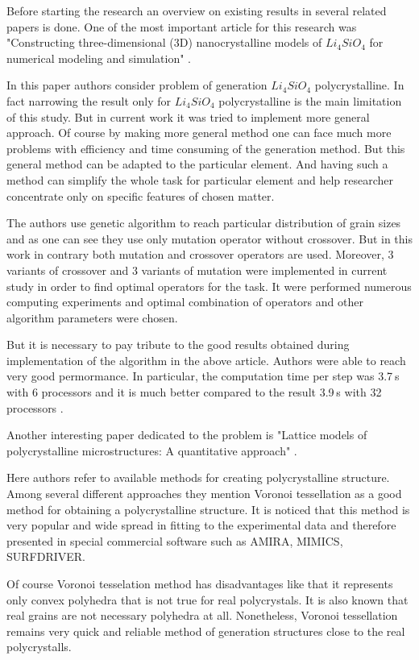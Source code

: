 \documentclass[12pt]{report}
\begin{document}
Before starting the research an overview on existing results in several related papers is done. One of the most important article for this research was "Constructing three-dimensional (3D) nanocrystalline models of $ Li_4SiO_4 $ for numerical modeling and simulation" \cite{shen15}.

In this paper authors consider problem of generation $ Li_4SiO_4 $ polycrystalline. In fact narrowing the result only for $ Li_4SiO_4 $ polycrystalline is the main limitation of this study. But in current work it was tried to implement more general approach. Of course by making more general method one can face much more problems with efficiency and time consuming of the generation method. But this general method can be adapted to the particular element. And having such a method can simplify the whole task for particular element and help researcher concentrate only on specific features of chosen matter.

The authors use genetic algorithm to reach particular distribution of grain sizes and as one can see they use only mutation operator without crossover. But in this work in contrary both mutation and crossover operators are used. Moreover, 3 variants of crossover and 3 variants of mutation were implemented in current study in order to find optimal operators for the task. It were performed numerous computing experiments and optimal combination of operators and other algorithm parameters were chosen.

But it is necessary to pay tribute to the good results obtained during implementation of the algorithm in the above article. Authors were able to reach very good permormance. In particular, the computation time per step was 3.7 s with 6 processors and it is much better compared to the result 3.9 s with 32 processors \cite{suzudo02}.

Another interesting paper dedicated to the problem is "Lattice models of polycrystalline microstructures: A quantitative approach" \cite{rinaldi08}.

Here authors refer to available methods for creating polycrystalline structure. Among several different approaches they mention Voronoi tessellation as a good method for obtaining a polycrystalline structure. It is noticed that this method is very popular and wide spread in fitting to the experimental data and therefore presented in special commercial software such as AMIRA, MIMICS, SURFDRIVER.

Of course Voronoi tesselation method has disadvantages like that it represents only convex polyhedra that is not true for real polycrystals. It is also known that real grains are not necessary polyhedra at all. Nonetheless, Voronoi tessellation remains very quick and reliable method of generation structures close to the real polycrystalls. 
\end{document}
